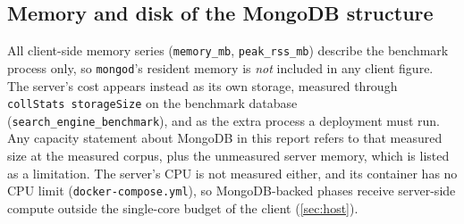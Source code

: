 \subsection{Memory and disk of the MongoDB structure}
\label{sec:index-memory}

All client-side memory series (\texttt{memory\_mb}, \texttt{peak\_rss\_mb})
describe the benchmark process only, so \texttt{mongod}'s resident memory is
\emph{not} included in any client figure. The server's cost appears instead
as its own storage, measured through \texttt{collStats storageSize} on the
benchmark database (\texttt{search\_engine\_benchmark}), and as the extra
process a deployment must run. Any capacity statement about MongoDB in this
report refers to that measured size at the measured corpus, plus the
unmeasured server memory, which is listed as a limitation. The server's CPU
is not measured either, and its container has no CPU limit
(\texttt{docker-compose.yml}), so MongoDB-backed phases receive server-side
compute outside the single-core budget of the client
(\cref{sec:host}).
